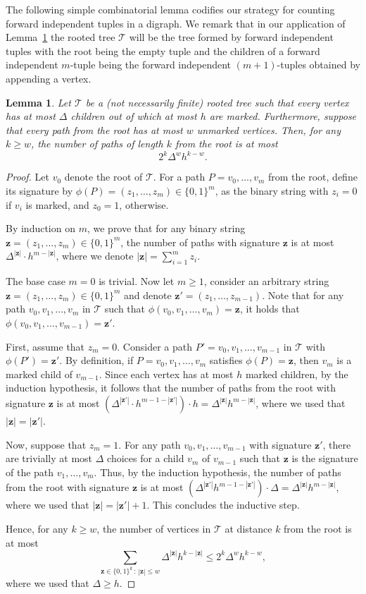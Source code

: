 \documentclass{article}
\theoremstyle{plain}
\newtheorem{lemma}[theorem]{Lemma}
\theoremstyle{definition}
\newcommand{\cT}{\mathcal{T}}
\newcommand{\bz}{\mathbf{z}}
\begin{document}
The following simple combinatorial lemma codifies our strategy for counting forward independent tuples in a digraph. We remark that in our application of Lemma~\ref{lem:tree-counting} the rooted tree $\cT$ will be the tree formed by forward independent tuples with the root being the empty tuple and the children of a forward independent $m$-tuple being the forward independent $(m+1)$-tuples obtained by appending a vertex.
\begin{lemma} \label{lem:tree-counting}
    Let $\cT$ be a (not necessarily finite) rooted tree such that every vertex has at most $\Delta$ children out of which at most $h$ are \emph{marked}. Furthermore, suppose that every path from the root has at most $w$ unmarked vertices. Then, for any $k \ge w$, the number of paths of length $k$ from the root is at most 
    \[ 2^k \Delta^w h^{k-w}. \] 
\end{lemma}
\begin{proof}
    Let $v_0$ denote the root of $\cT$. For a path $P = v_0, \dots, v_m$ from the root, define its signature by $\phi(P) = (z_1, \dots, z_m) \in \{0, 1\}^m$, as the binary string with $z_i = 0$ if $v_i$ is marked, and $z_0 = 1$, otherwise.
    
    By induction on $m$, we prove that for any binary string $\bz = (z_1, \dots, z_m) \in \{0, 1\}^m$, the number of paths with signature $\bz$ is at most $\Delta^{|\bz|} \cdot h^{m - |\bz|}$, where we denote $|\bz| = \sum_{i=1}^m z_i$.
    
    The base case $m = 0$ is trivial. Now let $m \ge 1$, consider an arbitrary string $\bz = (z_1, \dots, z_m) \in \{0, 1\}^m$ and denote $\bz' = (z_1, \dots, z_{m-1})$. Note that for any path $v_0, v_1, \dots, v_m$ in $\cT$ such that $\phi(v_0, v_1, \dots, v_m) = \bz$, it holds that $\phi(v_0, v_1, \dots, v_{m-1}) = \bz'$.

    First, assume that $z_m = 0$. Consider a path $P' = v_0, v_1,  \dots, v_{m-1}$ in $\cT$ with $\phi(P') = \bz'$. By definition, if $P = v_0, v_1, \dots, v_m$ satisfies $\phi(P) = \bz$, then $v_m$ is a marked child of $v_{m-1}$. Since each vertex has at most $h$ marked children, by the induction hypothesis, it follows that the number of paths from the root with signature $\bz$ is at most $( \Delta^{|\bz'|} \cdot h^{m-1 - |\bz'|} ) \cdot h = \Delta^{|\bz|} h^{m - |\bz|}$, where we used that $|\bz| = |\bz'|$.
    
    Now, suppose that $z_m=1$. For any path $v_0, v_1, \dots, v_{m-1}$ with signature $\bz'$, there are trivially at most $\Delta$ choices for a child $v_m$ of $v_{m-1}$ such that $\bz$ is the signature of the path $v_1, \dots, v_m$. Thus, by the induction hypothesis, the number of paths from the root with signature $\bz$ is at most $(\Delta^{|\bz'|} h^{m-1-|\bz'|}) \cdot \Delta = \Delta^{|\bz|} h^{m - |\bz|},$ where we used that $|\bz| = |\bz'| + 1$. This concludes the inductive step.

    Hence, for any $k \ge w$, the number of vertices in $\cT$ at distance $k$ from the root is at most 
    \[ \sum_{\bz \in \{0,1\}^k \, \colon \, |\bz| \le w} \Delta^{|\bz|} h^{k - |\bz|} \le 2^k \Delta^w h^{k-w}, \]
    where we used that $\Delta \ge h$.
\end{proof}
\end{document}
